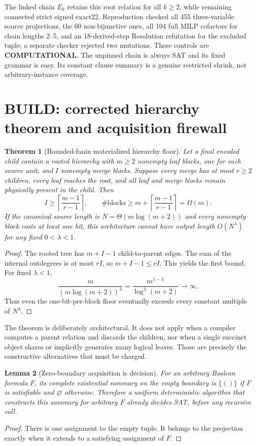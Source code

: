 \documentclass[11pt]{article}
\newtheorem{theorem}{Theorem}
\newtheorem{lemma}[theorem]{Lemma}
\begin{document}
The linked chain $E_k$ retains this root relation for all $k\ge2$, while
remaining connected strict signed exact22.  Reproduction checked all 455
three-variable source projections, the 60 non-bijunctive ones, all 104 full
MILP cofactors for chain lengths 2--5, and an 18-derived-step Resolution
refutation for the excluded tuple; a separate checker rejected two mutations.
These controls are \textbf{COMPUTATIONAL}.  The unpinned chain is always SAT
and its fixed grammar is easy.  Its constant clause summary is a genuine
restricted shrink, not arbitrary-instance coverage.

\section{BUILD: corrected hierarchy theorem and acquisition firewall}
\begin{theorem}[Bounded-fanin materialized hierarchy floor]
Let a final encoded child contain a rooted hierarchy with $m\ge2$ nonempty
leaf blocks, one for each source unit, and $I$ nonempty merge blocks.  Suppose
every merge has at most $r\ge2$ children, every leaf reaches the root, and all
leaf and merge blocks remain physically present in the child.  Then
\[
 I\ge\left\lceil\frac{m-1}{r-1}\right\rceil,
 \qquad
 \#\text{blocks}\ge m+\left\lceil\frac{m-1}{r-1}\right\rceil=\Omega(m).
\]
If the canonical source length is $N=\Theta(m\log(m+2))$ and every nonempty
block costs at least one bit, this architecture cannot have output length
$O(N^\lambda)$ for any fixed $0<\lambda<1$.
\end{theorem}
\begin{proof}
The rooted tree has $m+I-1$ child-to-parent edges.  The sum of the internal
outdegrees is at most $rI$, so $m+I-1\le rI$.  This yields the first bound.
For fixed $\lambda<1$,
\[
 \frac{m}{(m\log(m+2))^\lambda}
 =\frac{m^{1-\lambda}}{\log^\lambda(m+2)}\longrightarrow\infty.
\]
Thus even the one-bit-per-block floor eventually exceeds every constant
multiple of $N^\lambda$.
\end{proof}

The theorem is deliberately architectural.  It does not apply when a
compiler computes a parent relation and discards the children, nor when a
single succinct object shares or implicitly generates many logical leaves.
Those are precisely the constructive alternatives that must be charged.

\begin{lemma}[Zero-boundary acquisition is decision]
For an arbitrary Boolean formula $F$, its complete existential summary on
the empty boundary is $\{()\}$ if $F$ is satisfiable and $\varnothing$
otherwise.  Therefore a uniform deterministic algorithm that constructs this
summary for arbitrary $F$ already decides SAT, before any recursive call.
\end{lemma}
\begin{proof}
There is one assignment to the empty tuple.  It belongs to the projection
exactly when it extends to a satisfying assignment of $F$.
\end{proof}
\end{document}
